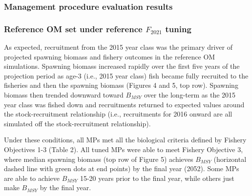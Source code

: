 \documentclass[11pt]{book}
\begin{document}
\hypertarget{management-procedure-evaluation-results}{%
\subsubsection{Management procedure evaluation results}\label{management-procedure-evaluation-results}}

\hypertarget{reference-om-set-under-reference-f_2021-tuning}{%
\subsubsection{\texorpdfstring{Reference OM set under reference \(F_{2021}\) tuning}{Reference OM set under reference F\_\{2021\} tuning}}\label{reference-om-set-under-reference-f_2021-tuning}}

As expected, recruitment from the 2015 year class was the primary driver of projected spawning biomass and fishery outcomes in the reference OM simulations. Spawning biomass increased rapidly over the first five years of the projection period as age-3 (i.e., 2015 year class) fish became fully recruited to the fisheries and then the spawning biomass (Figures 4 and 5, top row). Spawning biomass then trended downward toward \(B_{MSY}\) over the long-term as the 2015 year class was fished down and recruitments returned to expected values around the stock-recruitment relationship (i.e., recruitments for 2016 onward are all simulated off the stock-recruitment relationship).

Under these conditions, all MPs met all the biological criteria defined by Fishery Objectives 1-3 (Table 2). All tuned MPs were able to meet Fishery Objective 3, where median spawning biomass (top row of Figure 5) achieves \(B_{MSY}\) (horizontal dashed line with green dots at end points) by the final year (2052). Some MPs are able to achieve \(B_{MSY}\) 15-20 years prior to the final year, while others just make \(B_{MSY}\) by the final year.
\end{document}
